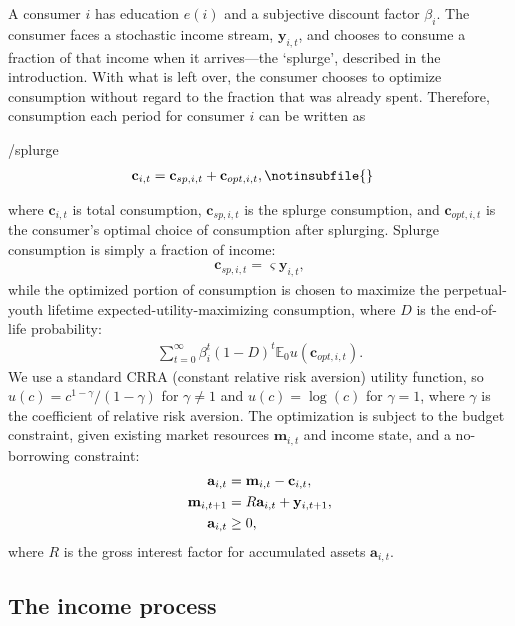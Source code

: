 \documentclass[\econtexRoot/HAFiscal]{subfiles}
\begin{document}
A consumer $i$ has education $e(i)$ and a subjective discount factor $\beta_i$. The consumer faces a stochastic income stream, $\mathbf{y}_{i,t}$, and chooses to consume a fraction of that income when it arrives---the `splurge', described in the introduction. With what is left over, the consumer chooses to optimize consumption without regard to the fraction that was already spent. Therefore, consumption each period for consumer $i$ can be written as
\begin{verbatimwrite}{\EqDir/splurge}
\begin{align}
  \mathbf{c}_{i,t} &= \mathbf{c}_{sp,i,t} + \mathbf{c}_{opt,i,t}, \notinsubfile{\label{eq:model}}
\end{align}
\end{verbatimwrite}

where $\mathbf{c}_{i,t}$ is total consumption, $\mathbf{c}_{sp,i,t}$ is the splurge consumption, and $\mathbf{c}_{opt,i,t}$ is the consumer's optimal choice of consumption after splurging. Splurge consumption is simply a fraction of income:
\begin{align}
  \mathbf{c}_{sp,i,t} = \varsigma \mathbf{y}_{i,t},
\end{align}
while the optimized portion of consumption is chosen to maximize the perpetual-youth lifetime expected-utility-maximizing consumption, where $D$ is the end-of-life probability:
\begin{align}
  \sum_{t=0}^{\infty}\beta_i^t (1-D)^t \mathbb{E}_0 u(\mathbf{c}_{opt,i,t}).
\end{align}
We use a standard CRRA (constant relative risk aversion) utility function, so $u(c) = c^{1-\gamma}/(1-\gamma)$ for $\gamma \neq 1$ and $u(c) = \log(c)$ for $\gamma=1$, where $\gamma$ is the coefficient of relative risk aversion. The optimization is subject to the budget constraint, given existing market resources $\mathbf{m}_{i,t}$ and income state, and a no-borrowing constraint: 
\begin{align}
  \mathbf{a}_{i,t} &= \mathbf{m}_{i,t} - \mathbf{c}_{i,t}, \notag \\ 
  \mathbf{m}_{i,t+1} &= R \mathbf{a}_{i,t} + \mathbf{y}_{i,t+1}, \\
  \mathbf{a}_{i,t} &\geq 0,   \notag
\end{align}
where $R$ is the gross interest factor for accumulated assets $\mathbf{a}_{i,t}$.

\hypertarget{the-income-process}{}\par\subsection{The income process}
\end{document}
